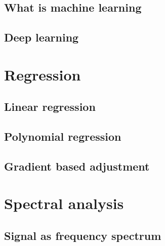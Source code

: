 \subsection{What is machine learning}

\subsection{Deep learning}


\section{Regression}

\subsection{Linear regression}

\subsection{Polynomial regression}

\subsection{Gradient based adjustment}


\section{Spectral analysis}

\subsection{Signal as frequency spectrum}

